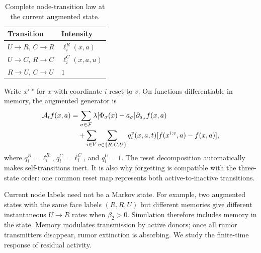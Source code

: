\documentclass[final,5p,times,twocolumn,sort&compress]{elsarticle}
\theoremstyle{plain}
\newcommand{\Fset}{\mathcal{F}}
\begin{document}
\begin{table}[t]
\centering
\caption{Complete node-transition law at the current augmented state.}
\label{tab:transitions}
\begin{tabular}{ll}
\toprule
Transition & Intensity\\
\midrule
$U\to R$, $C\to R$ & $\ell_i^R(x,a)$\\
$U\to C$, $R\to C$ & $\ell_i^C(x,a,u)$\\
$R\to U$, $C\to U$ & $1$\\
\bottomrule
\end{tabular}
\end{table}

Write $x^{i:v}$ for $x$ with coordinate $i$ reset to $v$. On functions differentiable in memory, the augmented generator is
\begin{align}
 \mathcal A_t f(x,a)
 &=\sum_{\sigma\in\Fset}\lambda[\Phi_\sigma(x)-a_\sigma]
              \partial_{a_\sigma}f(x,a)\notag\\
 &\quad+\sum_{i\in V}\sum_{v\in\{R,C,U\}}q_i^v(x,a,t)
      [f(x^{i:v},a)-f(x,a)],\label{eq:generator}
\end{align}
where $q_i^R=\ell_i^R$, $q_i^C=\ell_i^C$, and $q_i^U=1$. The reset decomposition automatically makes self-transitions inert. It is also why forgetting is compatible with the three-state order: one common reset map represents both active-to-inactive transitions.

Current node labels need not be a Markov state. For example, two augmented states with the same face labels $(R,R,U)$ but different memories give different instantaneous $U\to R$ rates when $\beta_2>0$. Simulation therefore includes memory in the state. Memory modulates transmission by active donors; once all rumor transmitters disappear, rumor extinction is absorbing. We study the finite-time response of residual activity.
\end{document}
